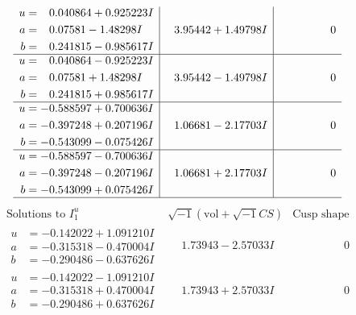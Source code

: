 \documentclass[1p]{elsarticle_modified}
\theoremstyle{definition}
\newcommand{\I}{\sqrt{-1}}
\begin{document}
$$\begin{array}{c|c|c}
\begin{aligned}
u &= \phantom{-}0.040864 + 0.925223 I \\
a &= \phantom{-}0.07581 - 1.48298 I \\
b &= \phantom{-}0.241815 - 0.985617 I\end{aligned}
 & \phantom{-}3.95442 + 1.49798 I & \phantom{-0.000000 } 0 \\ \hline\begin{aligned}
u &= \phantom{-}0.040864 - 0.925223 I \\
a &= \phantom{-}0.07581 + 1.48298 I \\
b &= \phantom{-}0.241815 + 0.985617 I\end{aligned}
 & \phantom{-}3.95442 - 1.49798 I & \phantom{-0.000000 } 0 \\ \hline\begin{aligned}
u &= -0.588597 + 0.700636 I \\
a &= -0.397248 + 0.207196 I \\
b &= -0.543099 - 0.075426 I\end{aligned}
 & \phantom{-}1.06681 - 2.17703 I & \phantom{-0.000000 } 0 \\ \hline\begin{aligned}
u &= -0.588597 - 0.700636 I \\
a &= -0.397248 - 0.207196 I \\
b &= -0.543099 + 0.075426 I\end{aligned}
 & \phantom{-}1.06681 + 2.17703 I & \phantom{-0.000000 } 0\\
 \hline 
 \end{array}$$\newpage$$\begin{array}{c|c|c}  
\text{Solutions to }I^u_{1}& \I (\text{vol} + \sqrt{-1}CS) & \text{Cusp shape}\\
 \hline 
\begin{aligned}
u &= -0.142022 + 1.091210 I \\
a &= -0.315318 - 0.470004 I \\
b &= -0.290486 - 0.637626 I\end{aligned}
 & \phantom{-}1.73943 - 2.57033 I & \phantom{-0.000000 } 0 \\ \hline\begin{aligned}
u &= -0.142022 - 1.091210 I \\
a &= -0.315318 + 0.470004 I \\
b &= -0.290486 + 0.637626 I\end{aligned}
 & \phantom{-}1.73943 + 2.57033 I & \phantom{-0.000000 } 0 \\ \hline\begin{aligned}

\end{aligned}
\end{array}$$
\end{document}
